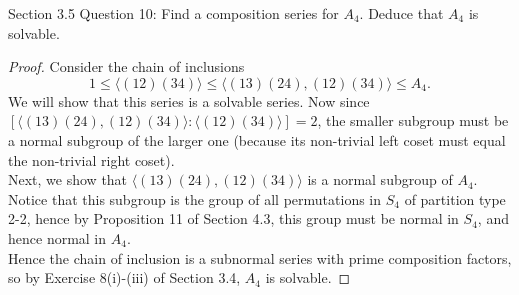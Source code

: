 Section 3.5 Question 10:
Find a composition series for $A_4$. Deduce that $A_4$ is solvable.
\begin{proof}
  Consider the chain of inclusions
  \begin{equation*}
    1 \leq \langle(12)(34)\rangle \leq \langle(13)(24),(12)(34)\rangle \leq
    A_4.
  \end{equation*}
  We will show that this series is a solvable series. Now since
  $[\langle(13)(24),(12)(34)\rangle:\langle(12)(34)\rangle]=2$, the smaller
  subgroup must be a normal subgroup of the larger one (because its
  non-trivial left coset must equal the non-trivial right coset). \\

  Next, we show that $\langle(13)(24),(12)(34)\rangle$ is a normal subgroup
  of $A_4$. Notice that this subgroup is the group of all permutations in
  $S_4$ of partition type 2-2, hence by Proposition 11 of Section 4.3, this
  group must be normal in $S_4$, and hence normal in $A_4$. \\

  Hence the chain of inclusion is a subnormal series with prime composition
  factors, so by Exercise 8(i)-(iii) of Section 3.4, $A_4$ is solvable.
\end{proof}
